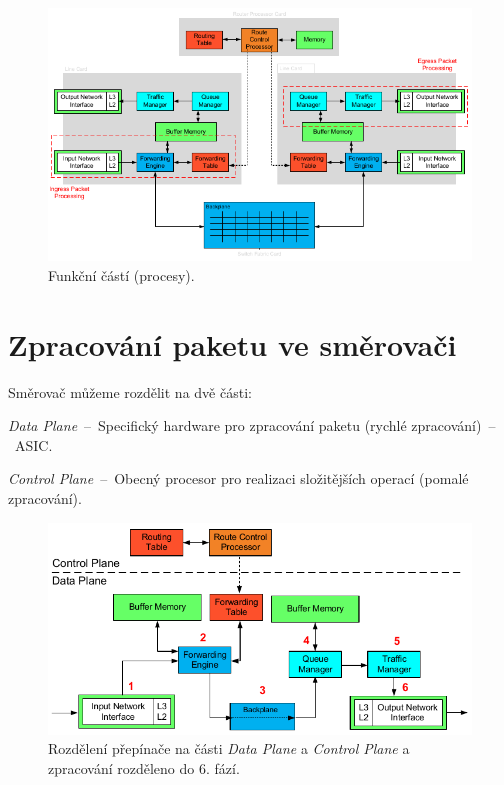 \begin{figure}[H]
    \centering
    \includegraphics[width=1\linewidth]{architektura_funkci_casti.pdf}
    \caption{Funkční částí (procesy).}
\end{figure}


\section{Zpracování paketu ve směrovači}

Směrovač můžeme rozdělit na dvě části: \begin{compactitem}
    \item \textit{Data Plane}~--~Specifický hardware pro zpracování paketu (rychlé zpracování)~--~ASIC.
    \item \textit{Control Plane}~--~Obecný procesor pro realizaci složitějších operací (pomalé zpracování).
\end{compactitem}

\begin{figure}[H]
    \centering
    \includegraphics[width=1\linewidth]{control_plane_and_data_plane.pdf}
    \caption{Rozdělení přepínače na části \textit{Data Plane} a \textit{Control Plane} a zpracování rozděleno do 6. fází.}
\end{figure}

